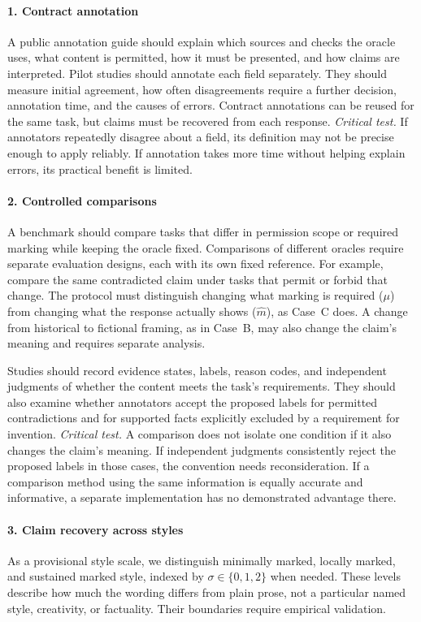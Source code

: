 \documentclass{clv2025}
\begin{document}
\paragraph{1. Contract annotation}
A public annotation guide should explain which sources and checks the oracle
uses, what content is permitted, how it must be presented, and how claims are
interpreted. Pilot studies should annotate each field separately. They should
measure initial agreement, how often disagreements require a further decision,
annotation time, and the causes of errors. Contract annotations can be reused
for the same task, but claims must be recovered from each response.
\emph{Critical test.} If annotators repeatedly disagree about a field, its
definition may not be precise enough to apply reliably. If annotation takes
more time without helping explain errors, its practical benefit is limited.

\paragraph{2. Controlled comparisons}
A benchmark should compare tasks that differ in permission scope or required
marking while keeping the oracle fixed. Comparisons of different oracles
require separate evaluation designs, each with its own fixed reference.
For example, compare the same contradicted claim under tasks that permit
or forbid that change. The protocol must distinguish changing what marking
is required ($\mu$) from changing what the response actually shows
($\widehat{m}$), as Case~C does. A change from historical to fictional framing,
as in Case~B, may also change the claim's meaning and requires separate analysis.

Studies should record evidence states, labels, reason codes, and independent
judgments of whether the content meets the task's requirements. They should
also examine whether annotators accept the proposed labels for permitted
contradictions and for supported facts explicitly excluded by a requirement
for invention.
\emph{Critical test.} A comparison does not isolate one condition if it also
changes the claim's meaning. If independent judgments consistently reject
the proposed labels in those cases, the convention needs reconsideration.
If a comparison method using the same information is equally accurate and
informative, a separate implementation has no demonstrated advantage there.

\paragraph{3. Claim recovery across styles}\label{par:style-scale}
As a provisional style scale, we distinguish minimally marked, locally
marked, and sustained marked style, indexed by $\sigma\in\{0,1,2\}$ when
needed. These levels describe how much the wording differs from plain prose,
not a particular named style, creativity, or factuality. Their boundaries
require empirical validation.
\end{document}
